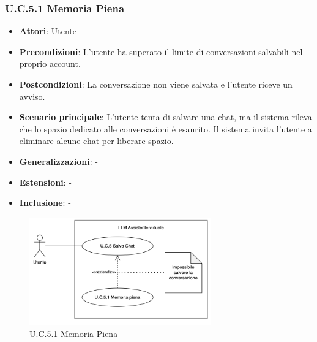 \subsubsection{U.C.5.1 Memoria Piena}
\begin{itemize}
    \item \textbf{Attori}: Utente
    \item \textbf{Precondizioni}: L'utente ha superato il limite di conversazioni salvabili nel proprio account.
    \item \textbf{Postcondizioni}: La conversazione non viene salvata e l'utente riceve un avviso. 
    \item \textbf{Scenario principale}: L'utente tenta di salvare una chat, ma il sistema rileva che lo spazio dedicato alle conversazioni è esaurito. Il sistema invita l'utente a eliminare alcune chat per liberare spazio.
    \item \textbf{Generalizzazioni}: -
    \item \textbf{Estensioni}: -
    \item \textbf{Inclusione}: -
\end{itemize}
\begin{figure}[H]
    \centering
    \includegraphics[width=0.7\textwidth]{img/UC5-1.png}
    \caption{U.C.5.1 Memoria Piena}
\end{figure}
\newpage


